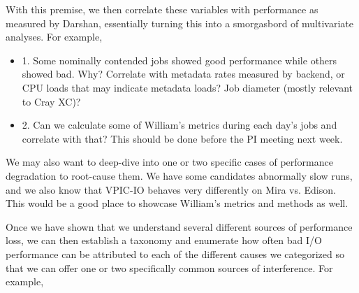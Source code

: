 \documentclass[conference,10pt,compsocconf]{IEEEtran}
\begin{document}
With this premise, we then correlate these variables with performance as
measured by Darshan, essentially turning this into a smorgasbord of
multivariate analyses.  For example,

\begin{itemize}
\item 1. Some nominally contended jobs showed good performance while others showed bad.  Why?  Correlate with metadata rates measured by backend, or CPU loads that may indicate metadata loads?  Job diameter (mostly relevant to Cray XC)?
\item 2. Can we calculate some of William's metrics during each day's jobs and correlate with that?  This should be done before the PI meeting next week.
\end{itemize}

We may also want to deep-dive into one or two specific cases of performance
degradation to root-cause them.  We have some candidates abnormally slow runs,
and we also know that VPIC-IO behaves very differently on Mira vs. Edison.
This would be a good place to showcase William's metrics and methods as well.

Once we have shown that we understand several different sources of performance
loss, we can then establish a taxonomy and enumerate how often bad I/O
performance can be attributed to each of the different causes we categorized so
that we can offer one or two specifically common sources of interference.  For
example,
\end{document}
